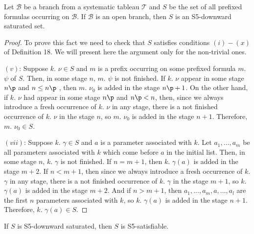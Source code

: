 \begin{pro}
Let $\mathcal{B}$ be a branch from a systematic tableau $\mathcal{T}$ and $S$ be the set of all prefixed formulas occurring on $\mathcal{B}$. If $\mathcal{B}$  is an open branch, then $S$ is an S5-downward saturated set. 
\end{pro}


\begin{proof}
To prove this fact we need to check that $S$ satisfies conditions $(i)-(x)$ of Definition 18. We will present here the argument only for the non-trivial ones.

\qquad $(v)$: Suppose $k.$ $\nu \in S$ and $m$ is a prefix occurring on some prefixed formula $m.$ $\psi$ of $S$. Then, in some stage $n$, $m.$ $\psi$ is not finished. If $k.$ $\nu$ appear in some stage $n\p$ and $n \leq n\p$ , then $m.$ $\nu_{0}$ is added in the stage $n\p +1$. On the other hand, if $k.$ $\nu$ had appear in some stage $n\p$ and $n\p<n$, then, since we always introduce a fresh occurrence of $k.$ $\nu$ in any stage, there is a not finished occurrence of $k.$ $\nu$ in the stage $n$, so $m.$ $\nu_{0}$ is added in the stage $n +1$. Therefore,  $m.$ $\nu_{0} \in S$.        

\qquad $(vii)$: Suppose $k.$ $\gamma \in S$ and $a$ is a parameter associated with $k$. Let $a_{1}, \dots , a_{m}$ be all parameters associated with $k$ which come before $a$ in the initial list. Then, in some stage $n$, $k.$ $\gamma$ is not finished. If $n = m+1$, then $k.$ $\gamma(a)$ is added in the stage $m+2$. If $n<m+1$, then since we always introduce a fresh occurrence of $k.$ $\gamma$ in any stage, there is a not finished occurrence of $k.$ $\gamma$ in the stage $m+1$, so $k.$ $\gamma(a)$ is added in the stage $m+2$. And if $n>m+1$, then $a_{1}, \dots , a_{m},a, \dots, a_{l}$ are the first $n$ parameters associated with $k$, so $k.$ $\gamma(a)$ is added in the stage $n+1$. Therefore,  $k.$ $\gamma(a) \in S$.        
\end{proof}

\begin{lema}
If $S$ is S5-downward saturated, then $S$ is S5-satisfiable. 
\end{lema}

